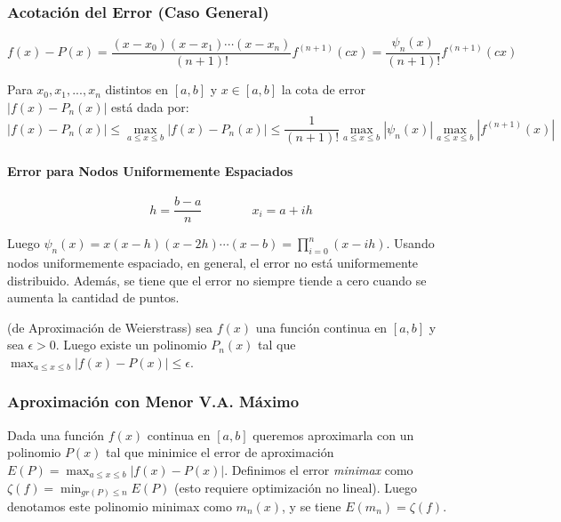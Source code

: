 \hypertarget{acotaciuxf3n-del-error-caso-general}{%
\subsubsection{Acotación del Error (Caso
General)}\label{acotaciuxf3n-del-error-caso-general}}

\[
f(x) - P(x) = \frac{(x-x_0)(x-x_1) \cdots (x-x_n)}{(n+1)!} f^{(n+1)}(cx)
= \frac{\psi_n(x)}{(n+1)!} f^{(n+1)}(cx)
\]

Para \(x_0, x_1, ..., x_n\) distintos en \([a,b]\) y \(x \in [a,b]\) la
cota de error \(|f(x) - P_n(x)|\) está dada por: \[
|f(x) - P_n(x)| \leq \max_{a \leq x \leq b} |f(x) - P_n(x)| \leq \frac{1}{(n+1)!}
\max_{a \leq x \leq b} |\psi_n(x)| \max_{a \leq x \leq b} |f^{(n+1)}(x)|
\]

\hypertarget{error-para-nodos-uniformemente-espaciados}{%
\paragraph{Error para Nodos Uniformemente
Espaciados}\label{error-para-nodos-uniformemente-espaciados}}

\[
h = \frac{b-a}{n}\qquad\qquad x_i = a + ih
\]

Luego \(\psi_n(x) = x(x-h)(x-2h)\cdots(x-b) = \prod_{i=0}^n (x - ih)\).
Usando nodos uniformemente espaciado, en general, el error no está
uniformemente distribuido. Además, se tiene que el error no siempre
tiende a cero cuando se aumenta la cantidad de puntos.

\Teorema (de Aproximación de Weierstrass) sea \(f(x)\) una función
continua en \([a,b]\) y sea \(\epsilon>0\). Luego existe un polinomio
\(P_n(x)\) tal que
\(\max_{a \leq x \leq b} |f(x) - P(x)| \leq \epsilon\).

\hypertarget{aproximaciuxf3n-con-menor-v.a.-muxe1ximo}{%
\subsubsection{Aproximación con Menor V.A.
Máximo}\label{aproximaciuxf3n-con-menor-v.a.-muxe1ximo}}

Dada una función \(f(x)\) continua en \([a,b]\) queremos aproximarla con
un polinomio \(P(x)\) tal que minimice el error de aproximación
\(E(P) = \max_{a \leq x \leq b} |f(x) - P(x)|\). Definimos el error
\emph{minimax} como \(\zeta(f) = \min_{gr(P) \leq n} E(P)\) (esto
requiere optimización no lineal). Luego denotamos este polinomio minimax
como \(m_n(x)\), y se tiene \(E(m_n) = \zeta(f)\).

